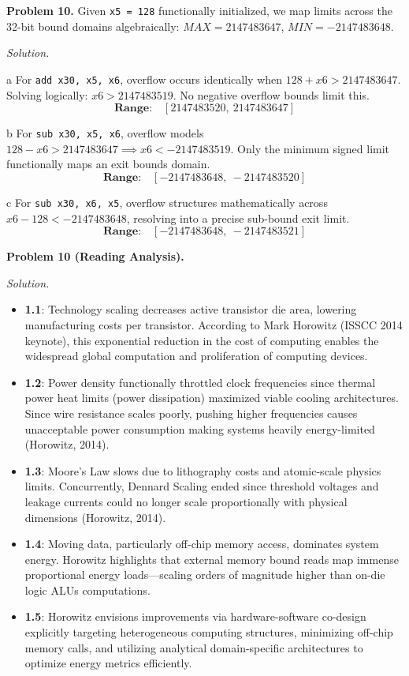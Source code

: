 \documentclass[11pt]{article}
\newcommand{\problem}[1]{\vspace{0.5em}\noindent\textbf{Problem #1.}\vspace{0.3em}}
\newenvironment{solution}{\par\noindent\textit{Solution.}}{\par\vspace{1em}}
\begin{document}
\problem{10}
Given \texttt{x5 = 128} functionally initialized, we map limits across the 32-bit bound domains algebraically: $MAX = 2147483647$, $MIN = -2147483648$.
\begin{solution}
    \begin{subproblem}{a}
        For \texttt{add x30, x5, x6}, overflow occurs identically when $128 + x6 > 2147483647$. Solving logically: $x6 > 2147483519$. No negative overflow bounds limit this.
        \[ \textbf{Range:} \quad [2147483520,\ 2147483647] \]
    \end{subproblem}
    \begin{subproblem}{b}
        For \texttt{sub x30, x5, x6}, overflow models $128 - x6 > 2147483647 \implies x6 < -2147483519$. Only the minimum signed limit functionally maps an exit bounds domain.
        \[ \textbf{Range:} \quad [-2147483648,\ -2147483520] \]
    \end{subproblem}
    \begin{subproblem}{c}
        For \texttt{sub x30, x6, x5}, overflow structures mathematically across $x6 - 128 < -2147483648$, resolving into a precise sub-bound exit limit. 
        \[ \textbf{Range:} \quad [-2147483648,\ -2147483521] \]
    \end{subproblem}
\end{solution}

\problem{10 (Reading Analysis)}
\begin{solution}
    \begin{itemize}
        \item \textbf{1.1}: Technology scaling decreases active transistor die area, lowering manufacturing costs per transistor. According to Mark Horowitz (ISSCC 2014 keynote), this exponential reduction in the cost of computing enables the widespread global computation and proliferation of computing devices.
        \item \textbf{1.2}: Power density functionally throttled clock frequencies since thermal power heat limits (power dissipation) maximized viable cooling architectures. Since wire resistance scales poorly, pushing higher frequencies causes unacceptable power consumption making systems heavily energy-limited (Horowitz, 2014).
        \item \textbf{1.3}: Moore's Law slows due to lithography costs and atomic-scale physics limits. Concurrently, Dennard Scaling ended since threshold voltages and leakage currents could no longer scale proportionally with physical dimensions (Horowitz, 2014).
        \item \textbf{1.4}: Moving data, particularly off-chip memory access, dominates system energy. Horowitz highlights that external memory bound reads map immense proportional energy loads---scaling orders of magnitude higher than on-die logic ALUs computations.
        \item \textbf{1.5}: Horowitz envisions improvements via hardware-software co-design explicitly targeting heterogeneous computing structures, minimizing off-chip memory calls, and utilizing analytical domain-specific architectures to optimize energy metrics efficiently.
    \end{itemize}
\end{solution}
\end{document}
